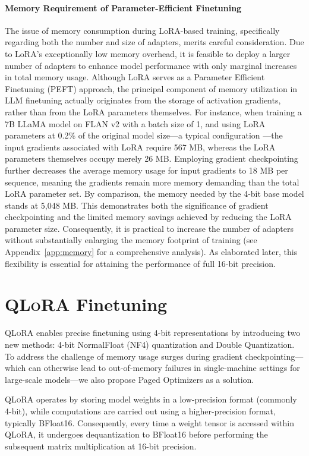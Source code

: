 \paragraph{Memory Requirement of Parameter-Efficient Finetuning} The issue of memory consumption during LoRA-based training, specifically regarding both the number and size of adapters, merits careful consideration. Due to LoRA’s exceptionally low memory overhead, it is feasible to deploy a larger number of adapters to enhance model performance with only marginal increases in total memory usage. Although LoRA serves as a Parameter Efficient Finetuning (PEFT) approach, the principal component of memory utilization in LLM finetuning actually originates from the storage of activation gradients, rather than from the LoRA parameters themselves. For instance, when training a 7B LLaMA model on FLAN v2 with a batch size of 1, and using LoRA parameters at 0.2\% of the original model size—a typical configuration \citep{hu2021lora,liu2022few}—the input gradients associated with LoRA require 567 MB, whereas the LoRA parameters themselves occupy merely 26 MB. Employing gradient checkpointing~\citep{chen2016training} further decreases the average memory usage for input gradients to 18 MB per sequence, meaning the gradients remain more memory demanding than the total LoRA parameter set. By comparison, the memory needed by the 4-bit base model stands at 5,048 MB. This demonstrates both the significance of gradient checkpointing and the limited memory savings achieved by reducing the LoRA parameter size. Consequently, it is practical to increase the number of adapters without substantially enlarging the memory footprint of training (see Appendix~\ref{app:memory} for a comprehensive analysis). As elaborated later, this flexibility is essential for attaining the performance of full 16-bit precision.

\section{\textsc{QLoRA} Finetuning}

\textsc{QLoRA} enables precise finetuning using 4-bit representations by introducing two new methods: 4-bit NormalFloat (NF4) quantization and Double Quantization. To address the challenge of memory usage surges during gradient checkpointing—which can otherwise lead to out-of-memory failures in single-machine settings for large-scale models—we also propose Paged Optimizers as a solution.

\textsc{QLoRA} operates by storing model weights in a low-precision format (commonly 4-bit), while computations are carried out using a higher-precision format, typically BFloat16. Consequently, every time a weight tensor is accessed within \textsc{QLoRA}, it undergoes dequantization to BFloat16 before performing the subsequent matrix multiplication at 16-bit precision.

